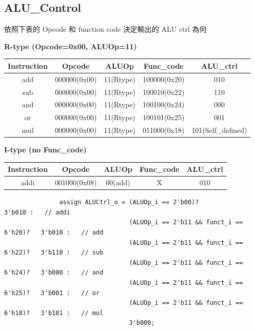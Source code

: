 \documentclass[12t, a4paper]{article}
\begin{document}
\begin{CJK}{UTF8}{bkai}
		\subsection{ALU\_Control}
			依照下表的 Opcode 和 function code 決定輸出的 ALU ctrl 為何 \par
			{\bf \large R-type (Opcode=0x00, ALUOp=11)} \par  \vspace{0.2em}
			\begin{tabular}[c]{|c|c|c|c|c|}
			\hline
				Instruction	&Opcode			&ALUOp		&Func\_code		&ALU\_ctrl \\
			\hline
				add			&000000(0x00)	&11(Rtype)	&100000(0x20)	&010 \\
			\hline
				sub			&000000(0x00)	&11(Rtype)	&100010(0x22)	&110 \\
			\hline
				and			&000000(0x00)	&11(Rtype)	&100100(0x24)	&000 \\
			\hline
				or			&000000(0x00)	&11(Rtype)	&100101(0x25)	&001 \\
			\hline
				mul			&000000(0x00)	&11(Rtype)	&011000(0x18)	&101(Self\_defined) \\
			\hline
			\end{tabular}  \par \vspace{0.4em}
			{\bf \large I-type (no Func\_code)} \par  \vspace{0.3em}
			\begin{tabular}[c]{|c|c|c|c|c|}
			\hline
				Instruction	&Opcode			&ALUOp		&Func\_code	&ALU\_ctrl \\
			\hline
				addi		&001000(0x08)	&00(add)	&X			&010 \\
			\hline
			\end{tabular} \par \vspace{0.1cm}
			
			\begin{verbatim}
			   assign ALUCtrl_o = (ALUOp_i == 2'b00)?                     3'b010 :   // addi
			                      (ALUOp_i == 2'b11 && funct_i == 6'h20)?	3'b010 :   // add
			                      (ALUOp_i == 2'b11 && funct_i == 6'h22)?	3'b110 :   // sub
			                      (ALUOp_i == 2'b11 && funct_i == 6'h24)?	3'b000 :   // and
			                      (ALUOp_i == 2'b11 && funct_i == 6'h25)?	3'b001 :   // or
			                      (ALUOp_i == 2'b11 && funct_i == 6'h18)?	3'b101 :   // mul
			                      3'b000;
			\end{verbatim}


\end{CJK}
\end{document}
